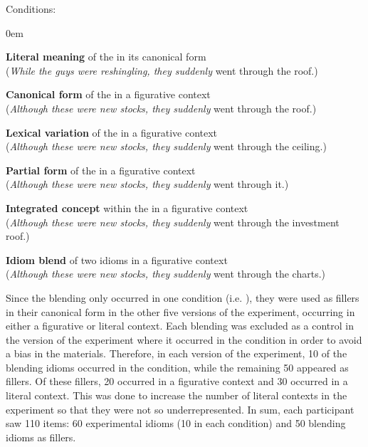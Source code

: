 \documentclass[output=paper
,modfonts
,nonflat]{langsci/langscibook}
\begin{document}
{\sc Conditions:}
\begin{enumerate}
\small{
\itemsep0em
\item 	{\bf Literal meaning}  of the  in its canonical form\\
	(\textit{While the guys were reshingling, they suddenly} went through the roof.)
\item 	{\bf Canonical form} of the  in a figurative context\\
	(\textit{Although these were new stocks, they suddenly} went through the roof.)
\item	{\bf Lexical variation}  of the  in a figurative context\\
	(\textit{Although these were new stocks, they suddenly} went through the ceiling.)
\item	{\bf Partial form}  of the  in a figurative context\\
	(\textit{Although these were new stocks, they suddenly} went through it.)
\item	{\bf Integrated concept}  within the  in a figurative context\\
	(\textit{Although these were new stocks, they suddenly} went through the investment roof.)
\item	{\bf Idiom blend}  of two idioms in a figurative context\\
	(\textit{Although these were new stocks, they suddenly} went through the charts.)
	}
\end{enumerate}


Since the blending  only occurred in one condition (i.e.  ), they were used as fillers in their canonical form in the other five versions of the experiment, occurring in either a figurative or literal context. Each blending   was excluded as a control in the version of the experiment where it occurred in the   condition in order to avoid a bias in the materials. Therefore, in each version of the experiment, 10 of the blending idioms occurred in the   condition, while the remaining 50 appeared as fillers. Of these fillers, 20 occurred in a figurative context and 30 occurred in a literal context. This was done to increase the number of literal contexts in the experiment so that they were not so underrepresented. In sum, each participant saw 110 items: 60 experimental idioms (10 in each condition) and 50 blending idioms as fillers.
\end{document}

